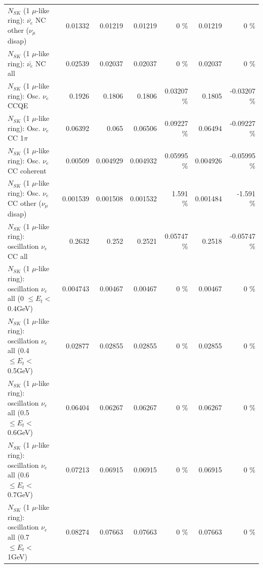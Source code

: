 \begin{table}
\begin{tabular}{| l | r | r | r  r | r  r |}
          $N_{SK}$ (1 $\mu$-like ring): $\bar{\nu_e}$ NC other ($\nu_\mu$ disap) &         0.01332 &         0.01219 &         0.01219 &        0 \%  &         0.01219 &        0 \%  \\ 
                            $N_{SK}$ (1 $\mu$-like ring): $\bar{\nu_{e}}$ NC all &         0.02539 &         0.02037 &         0.02037 &        0 \%  &         0.02037 &        0 \%  \\ 
\hline
\hline
\hline
                                 $N_{SK}$ (1 $\mu$-like ring): Osc. $\nu_e$ CCQE &          0.1926 &          0.1806 &          0.1806 &  0.03207 \%  &          0.1805 & -0.03207 \%  \\ 
                            $N_{SK}$ (1 $\mu$-like ring): Osc. $\nu_e$ CC 1$\pi$ &         0.06392 &           0.065 &         0.06506 &  0.09227 \%  &         0.06494 & -0.09227 \%  \\ 
                          $N_{SK}$ (1 $\mu$-like ring): Osc. $\nu_e$ CC coherent &         0.00509 &        0.004929 &        0.004932 &  0.05995 \%  &        0.004926 & -0.05995 \%  \\ 
           $N_{SK}$ (1 $\mu$-like ring): Osc. $\nu_e$ CC other ($\nu_\mu$ disap) &        0.001539 &        0.001508 &        0.001532 &    1.591 \%  &        0.001484 &   -1.591 \%  \\ 
                        $N_{SK}$ (1 $\mu$-like ring): oscillation $\nu_e$ CC all &          0.2632 &           0.252 &          0.2521 &  0.05747 \%  &          0.2518 & -0.05747 \%  \\ 
\hline
$N_{SK}$ (1 $\mu$-like ring): oscillation $\nu_{e}$ all (0 $\leq E_{t} <$ 0.4GeV) &        0.004743 &         0.00467 &         0.00467 &        0 \%  &         0.00467 &        0 \%  \\ 
$N_{SK}$ (1 $\mu$-like ring): oscillation $\nu_{e}$ all (0.4 $\leq E_{t} <$ 0.5GeV) &         0.02877 &         0.02855 &         0.02855 &        0 \%  &         0.02855 &        0 \%  \\ 
$N_{SK}$ (1 $\mu$-like ring): oscillation $\nu_{e}$ all (0.5 $\leq E_{t} <$ 0.6GeV) &         0.06404 &         0.06267 &         0.06267 &        0 \%  &         0.06267 &        0 \%  \\ 
$N_{SK}$ (1 $\mu$-like ring): oscillation $\nu_{e}$ all (0.6 $\leq E_{t} <$ 0.7GeV) &         0.07213 &         0.06915 &         0.06915 &        0 \%  &         0.06915 &        0 \%  \\ 
$N_{SK}$ (1 $\mu$-like ring): oscillation $\nu_{e}$ all (0.7 $\leq E_{t} <$ 1GeV) &         0.08274 &         0.07663 &         0.07663 &        0 \%  &         0.07663 &        0 \%  \\ 

\end{tabular}
\end{table}
